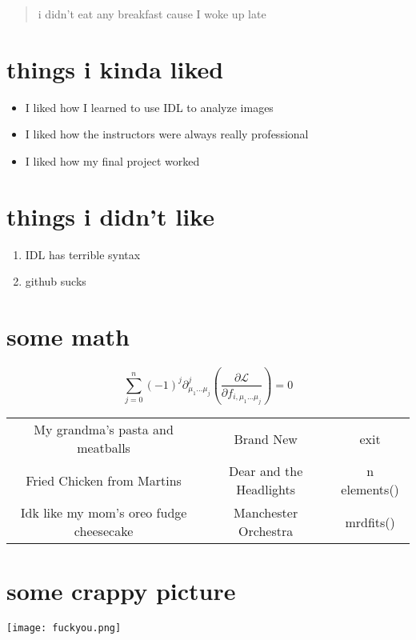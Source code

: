 \documentclass[a4paper]{article}
\title{}
\author{}
\date{\today}
\begin{document}
\maketitle
\begin{abstract}
	i didn't eat any breakfast cause I woke up late
\end{abstract}
\section{things i kinda liked}
\begin{itemize}
\item I liked how I learned to use IDL to analyze images
\item I liked how the instructors were always really professional
\item I liked how my final project worked

\end{itemize}

\section{things i didn't like}
\begin{enumerate}
	\item IDL has terrible syntax
	\item github sucks
\end{enumerate}
\section{some math}

$$
\sum_{j=0}^n (-1)^j \partial_{ \mu_{1}\ldots \mu_{j} }^j \left( \frac{\partial \mathcal{L} }{\partial f_{i,\mu_1\dots\mu_j}}\right)=0 $$
\begin{center}
	\begin{tabular}{ |c|c|c| } 
		 \hline
		  My grandma's pasta and meatballs & Brand New & exit \\ 
		 Fried Chicken from Martins & Dear and the Headlights & n elements() \\ 
		 Idk like my mom's oreo fudge cheesecake & Manchester Orchestra & mrdfits()\\ 
		  \hline
	  \end{tabular}
  \end{center}
  \section{some crappy picture}
  \texttt{[image: fuckyou.png]}
\end{document}

